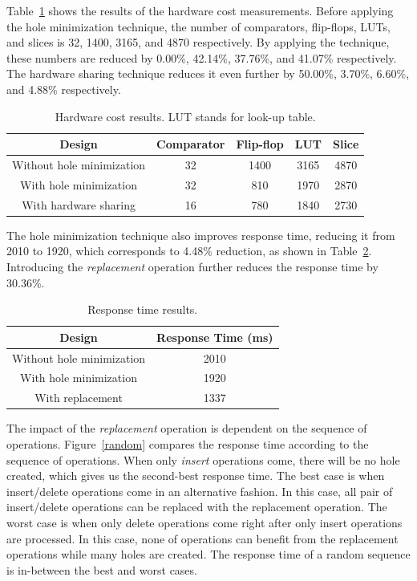 \documentclass[10pt, conference, compsocconf]{IEEEtran}
\begin{document}
Table~\ref{table2} shows the results of the hardware cost measurements.
Before applying the hole minimization technique, the number of comparators, flip-flops, LUTs, and slices is 32, 1400, 3165, and 4870 respectively.
By applying the technique, these numbers are reduced by 0.00\%, 42.14\%, 37.76\%, and 41.07\% respectively.
The hardware sharing technique reduces it even further by 50.00\%, 3.70\%, 6.60\%, and 4.88\% respectively.

\begin{table}
 \begin{center}
 \caption{Hardware cost results. LUT stands for look-up table.}
\label{table2}
\begin{tabular}{|c|c|c|c|c|}
 \hline
 Design  & Comparator  & Flip-flop & LUT &Slice \\
 \hline
 \hline
Without hole minimization & 32 & 1400 & 3165 & 4870 \\
 \hline
With hole minimization & 32 & 810 & 1970 & 2870 \\
  \hline
With hardware sharing & 16 & 780 & 1840 & 2730 \\
\hline
\end{tabular}
\end{center}
\end{table}

The hole minimization technique also improves response time, reducing it from 2010 to 1920, which corresponds to 4.48\% reduction, as shown in Table~\ref{table3}.
Introducing the {\it replacement} operation further reduces the response time by 30.36\%.

\begin{table}
 \begin{center}
 \caption{Response time results.}
\label{table3}
\begin{tabular}{ |c|c|}
 \hline
 Design  &  Response Time (ms) \\
 \hline
Without hole minimization & 2010 \\
  \hline
With hole minimization & 1920 \\
  \hline
With replacement & 1337 \\
  \hline
\end{tabular}
\end{center}
\end{table}

The impact of the {\it replacement} operation is dependent on the sequence of operations.
Figure~\ref{random} compares the response time according to the sequence of operations.
When only {\it insert} operations come, there will be no hole created, which gives us the second-best response time.
The best case is when insert/delete operations come in an alternative fashion.
In this case, all pair of insert/delete operations can be replaced with the replacement operation.
The worst case is when only delete operations come right after only insert operations are processed.
In this case, none of operations can benefit from the replacement operations while many holes are created.
The response time of a random sequence is in-between the best and worst cases.
\end{document}
